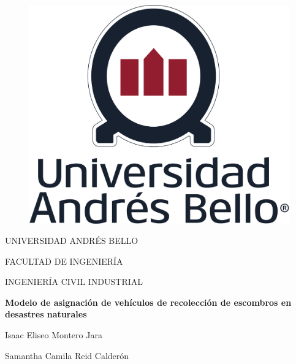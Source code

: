 \documentclass[12pt,a4paper]{article}
\begin{document}

\begin{titlepage}

\begin{center}
\begin{figure}[htb]
\begin{center}
\includegraphics[scale=0.7]{Figuras/logounab.png}
\end{center}
\end{figure}

\vspace*{2cm}

UNIVERSIDAD ANDRÉS BELLO

FACULTAD DE INGENIERÍA

INGENIERÍA CIVIL INDUSTRIAL

\vspace*{3cm}

\begin{Large}
\textbf{Modelo de asignación de vehículos de recolección de escombros en desastres naturales}
\end{Large}

\vspace*{3cm}

Isaac Eliseo Montero Jara

\vspace*{0.5cm}

Samantha Camila Reid Calderón

\vspace*{2.5cm}


\end{center}
\end{titlepage}
\end{document}
